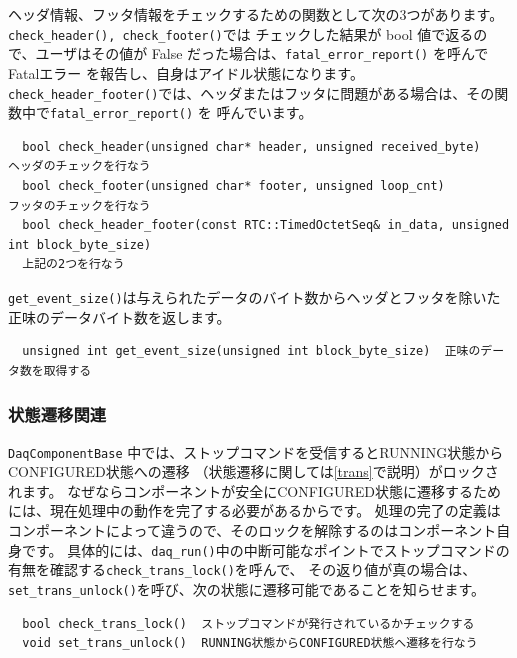 \documentclass[a4j,10pt,dvips,onecolumn,oneside,final]{jarticle}%
\begin{document}
ヘッダ情報、フッタ情報をチェックするための関数として次の3つがあります。\verb|check_header(), check_footer()|では
チェックした結果が bool 値で返るので、ユーザはその値が False だった場合は、\verb|fatal_error_report()| を呼んでFatalエラー
を報告し、自身はアイドル状態になります。
\verb|check_header_footer()|では、ヘッダまたはフッタに問題がある場合は、その関数中で\verb|fatal_error_report()| を
呼んでいます。

\begin{Verbatim}
  bool check_header(unsigned char* header, unsigned received_byte)     ヘッダのチェックを行なう
  bool check_footer(unsigned char* footer, unsigned loop_cnt)          フッタのチェックを行なう
  bool check_header_footer(const RTC::TimedOctetSeq& in_data, unsigned int block_byte_size) 
  上記の2つを行なう
\end{Verbatim}

\verb|get_event_size()|は与えられたデータのバイト数からヘッダとフッタを除いた正味のデータバイト数を返します。
\begin{Verbatim}
  unsigned int get_event_size(unsigned int block_byte_size)  正味のデータ数を取得する
\end{Verbatim}

\subsubsection{状態遷移関連}\label{state}
\verb|DaqComponentBase| 中では、ストップコマンドを受信するとRUNNING状態からCONFIGURED状態への遷移
（状態遷移に関しては\ref{trans}で説明）がロックされます。
なぜならコンポーネントが安全にCONFIGURED状態に遷移するためには、現在処理中の動作を完了する必要があるからです。
処理の完了の定義はコンポーネントによって違うので、そのロックを解除するのはコンポーネント自身です。
具体的には、\verb|daq_run()|中の中断可能なポイントでストップコマンドの有無を確認する\verb|check_trans_lock()|を呼んで、
その返り値が真の場合は、\verb|set_trans_unlock()|を呼び、次の状態に遷移可能であることを知らせます。

\begin{Verbatim}
  bool check_trans_lock()  ストップコマンドが発行されているかチェックする
  void set_trans_unlock()  RUNNING状態からCONFIGURED状態へ遷移を行なう
\end{Verbatim}
\end{document}
